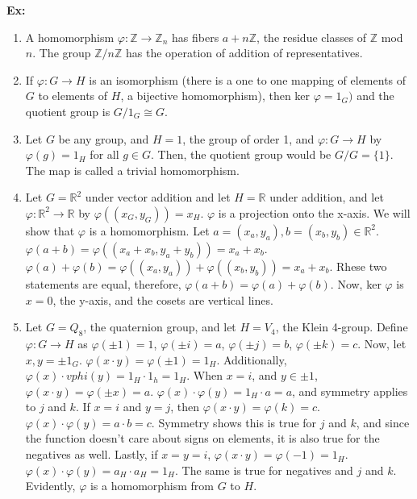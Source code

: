\documentclass{article}
\begin{document}
\textbf{Ex:} 

\begin{enumerate}
    \item A homomorphism $\varphi : \mathbb{Z} \rightarrow \mathbb{Z}_n$ has fibers $a + n\mathbb{Z}$, the residue classes of $\mathbb{Z}$ mod $n$. The group $\mathbb{Z} / n \mathbb{Z}$ has the operation of addition of representatives.
    \item If $\varphi : G \rightarrow H$ is an isomorphism (there is a one to one mapping of elements of $G$ to elements of $H$, a bijective homomorphism), then ker $\varphi = 1_G)$ and the quotient group is $G/1_G \cong G$.
    \item Let $G$ be any group, and $H = 1$, the group of order 1, and $\varphi : G \rightarrow H$ by $\varphi (g) = 1_H$ for all $g\in G$. Then, the quotient group would be $G/G = \{1\}$. The map is called a trivial homomorphism.
    \item Let $G = \mathbb{R}^2$ under vector addition and let $H = \mathbb{R}$ under addition, and let $\varphi: \mathbb{R}^2 \rightarrow \mathbb{R}$ by $\varphi ((x_G,y_G)) = x_H$. $\varphi $ is a projection onto the x-axis. We will show that $\varphi$ is a homomorphism. Let $a = (x_a,y_a), b = (x_b,y_b) \in \mathbb{R}^2$. $\varphi (a + b) = \varphi ((x_a + x_b, y_a + y_b)) = x_a + x_b$. $\varphi (a) + \varphi (b) = \varphi ((x_a, y_a)) + \varphi ((x_b, y_b)) = x_a + x_b$. Rhese two statements are equal, therefore, $\varphi (a+b) = \varphi (a) + \varphi (b)$. Now, ker $\varphi$ is $x=0$, the y-axis, and the cosets are vertical lines.
    \item Let $G = Q_8$, the quaternion group, and let $H = V_4$, the Klein 4-group. Define $\varphi : G \rightarrow H$ as $\varphi (\pm 1) = 1$, $\varphi (\pm i) = a$, $\varphi (\pm j) = b$, $\varphi (\pm k) = c$. Now, let $x,y = {\pm 1_G}$. $\varphi (x \cdot y) = \varphi (\pm 1) = 1_H$. Additionally, $\varphi (x) \cdot vphi (y) = 1_H \cdot 1_h = 1_H$. When $x = i$, and $y \in \pm 1$, $\varphi (x \cdot y) = \varphi (\pm x) = a$. $\varphi (x) \cdot \varphi (y) = 1_H \cdot a = a$, and symmetry applies to $j$ and $k$. If $x = i$ and $y = j$, then $\varphi (x \cdot y) = \varphi (k) = c$. $\varphi (x) \cdot \varphi (y) = a \cdot b = c$. Symmetry shows this is true for $j$ and $k$, and since the function doesn't care about signs on elements, it is also true for the negatives as well. Lastly, if $x = y = i$, $\varphi (x \cdot y) = \varphi (-1) = 1_H$. $\varphi (x) \cdot \varphi (y) = a_H \cdot a_H = 1_H$. The same is true for negatives and $j$ and $k$. Evidently, $\varphi$ is a homomorphism from $G$ to $H$. 
\end{enumerate}
\end{document}
